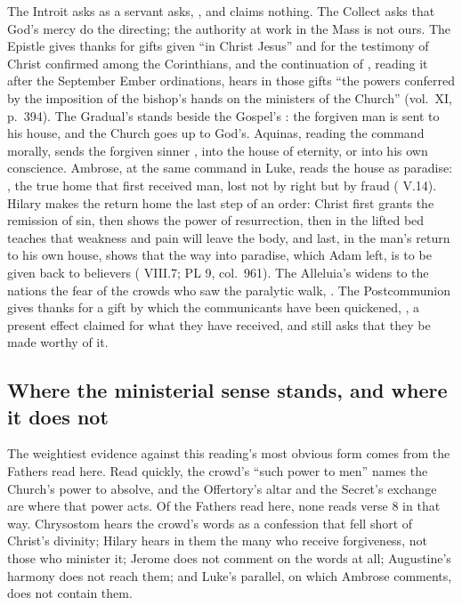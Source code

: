 The Introit asks as a servant asks, , and claims
nothing. The Collect asks that God's mercy do the directing; the authority at
work in the Mass is not ours. The Epistle gives thanks for gifts given ``in
Christ Jesus'' and for the testimony of Christ confirmed among the Corinthians,
and the continuation of , reading it after the
September Ember ordinations, hears in those gifts ``the powers conferred by the
imposition of the bishop's hands on the ministers of the Church'' (vol.~XI,
p.~394). The Gradual's  stands beside the
Gospel's : the forgiven man is sent to his house, and
the Church goes up to God's. Aquinas, reading the command morally, sends the
forgiven sinner ,
into the house of eternity, or into his own conscience. Ambrose, at the same
command in Luke, reads the house as paradise: , the true home that first received man,
lost not by right but by fraud ( V.14). Hilary makes
the return home the last step of an order: Christ first grants the remission
of sin, then shows the power of resurrection, then in the lifted bed teaches
that weakness and pain will leave the body, and last, in the man's return to
his own house, shows that the way into paradise, which Adam left, is to be
given back to believers ( VIII.7; PL 9,
col.~961). The Alleluia's  widens to the nations the
fear of the crowds who saw the paralytic walk, . The
Postcommunion gives thanks for a gift by which the communicants have been
quickened, , a present effect claimed for what
they have received, and still asks that they be made worthy of it.

\subsection{Where the ministerial sense stands, and where it does not}

The weightiest evidence against this reading's most obvious form comes from
the Fathers read here. Read quickly, the crowd's ``such power to men''
names the Church's power to absolve, and the Offertory's altar and the Secret's
exchange are where that power acts. Of the Fathers read here, none reads verse
8 in that way. Chrysostom hears the crowd's words as a confession that fell
short of Christ's divinity; Hilary hears in them the many who receive
forgiveness, not those who minister it; Jerome does not comment on the words at
all; Augustine's harmony does not reach them; and Luke's parallel, on which
Ambrose comments, does not contain them.

